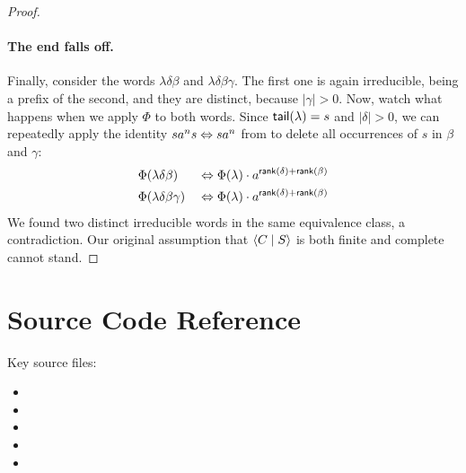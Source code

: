 \documentclass[../generics]{subfiles}
\begin{document}
\begin{proof}
\paragraph{The end falls off.}
Finally, consider the words $\lambda \delta \beta$ and $\lambda \delta \beta \gamma$. The first one is again irreducible, being a prefix of the second, and they are distinct, because $|\gamma| > 0$. Now, watch what happens when we apply $\Phi$ to both words. Since $\mathsf{tail}(\lambda) = s$ and $|\delta| > 0$, we can repeatedly apply the identity $sa^ns \Leftrightarrow sa^n$ from  to delete all occurrences of $s$ in $\beta$ and $\gamma$:
\begin{alignat*}{2}
& \Phi(\lambda \delta \beta) & {} \Leftrightarrow \Phi(\lambda) \cdot a^{\mathsf{rank}(\delta) + \mathsf{rank}(\beta)} \\
& \Phi(\lambda \delta \beta \gamma) & {} \Leftrightarrow \Phi(\lambda) \cdot a^{\mathsf{rank}(\delta) + \mathsf{rank}(\beta)}
\end{alignat*}
We found two distinct irreducible words in the same equivalence class, a contradiction. Our original assumption that $\langle C \mid S\rangle$ is both finite and complete cannot stand.
\end{proof}

\section{Source Code Reference}\label{src:completion}

Key source files:
\begin{itemize}
\item {}
\item {}
\item {}
\item {}
\item {}
\end{itemize}
\end{document}
